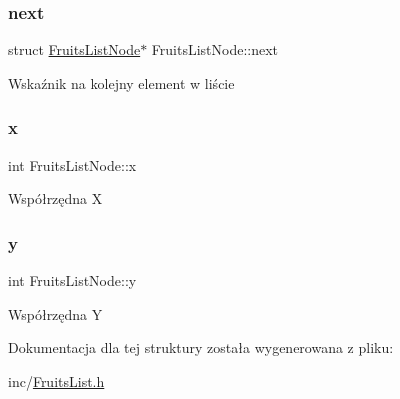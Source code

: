 \subsubsection{\texorpdfstring{next}{next}}
{\footnotesize\ttfamily struct \mbox{\hyperlink{struct_fruits_list_node}{Fruits\+List\+Node}}$\ast$ Fruits\+List\+Node\+::next}

Wskaźnik na kolejny element w liście \mbox{\label{struct_fruits_list_node_ad90592a152c578e837813f6e9a06d4e8}} 
\subsubsection{\texorpdfstring{x}{x}}
{\footnotesize\ttfamily int Fruits\+List\+Node\+::x}

Współrzędna X \mbox{\label{struct_fruits_list_node_a332812dcefff98ebb34d2d7d02145ea2}} 
\subsubsection{\texorpdfstring{y}{y}}
{\footnotesize\ttfamily int Fruits\+List\+Node\+::y}

Współrzędna Y 

Dokumentacja dla tej struktury została wygenerowana z pliku\+:\begin{DoxyCompactItemize}
\item 
inc/\mbox{\hyperlink{_fruits_list_8h}{Fruits\+List.\+h}}\end{DoxyCompactItemize}

